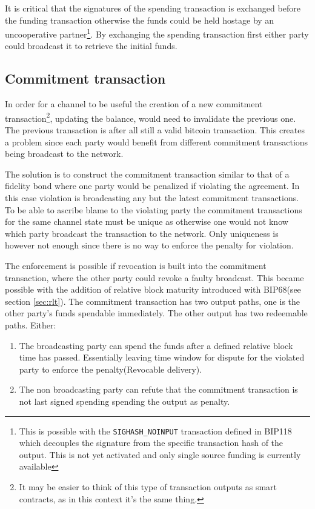 It is critical that the signatures of the spending transaction is exchanged before the funding transaction otherwise the funds could be held hostage by an uncooperative partner\footnote{This is possible with the \texttt{SIGHASH\_NOINPUT} transaction defined in BIP118\cite{bip:0118:sighash:noinput} which decouples the signature from the specific transaction hash of the output. This is not yet activated and only single source funding is currently available}. By exchanging the spending transaction first either party could broadcast it to retrieve the initial funds.

\subsection{Commitment transaction}

In order for a channel to be useful the creation of a new commitment transaction\footnote{It may be easier to think of this type of transaction outputs as smart contracts, as in this context it's the same thing.}, updating the balance, would need to invalidate the previous one. The previous transaction is after all still a valid bitcoin transaction. This creates a problem since each party would benefit from different commitment transactions being broadcast to the network.

The solution is to construct the commitment transaction similar to that of a fidelity bond where one party would be penalized if violating the agreement. In this case violation is broadcasting any but the latest commitment transactions. To be able to ascribe blame to the violating party the commitment transactions for the same channel state must be unique as otherwise one would not know which party broadcast the transaction to the network. Only uniqueness is however not enough since there is no way to enforce the penalty for violation.

The enforcement is possible if revocation is built into the commitment transaction, where the other party could revoke a faulty broadcast. This became possible with the addition of relative block maturity introduced with BIP68(see section \ref{sec:rlt}). The commitment transaction has two output paths, one is the other party's funds spendable immediately. The other output has two redeemable paths. Either:

\begin{enumerate}
	\item The broadcasting party can spend the funds after a defined relative block time has passed. Essentially leaving time window for dispute for the violated party to enforce the penalty(Revocable delivery).
	\item The non broadcasting party can refute that the commitment transaction is not last signed spending spending the output as penalty.
\end{enumerate}

